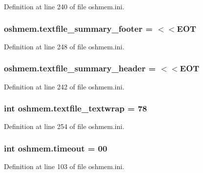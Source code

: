 Definition at line 240 of file oshmem.\-ini.

\hypertarget{namespaceoshmem_a8aad4aa9999524970a03dbaac95ee861}{
\subsubsection[{textfile\-\_\-summary\-\_\-footer}]{\setlength{\rightskip}{0pt plus 5cm}oshmem.\-textfile\-\_\-summary\-\_\-footer = $<$$<$E\-O\-T}}\label{namespaceoshmem_a8aad4aa9999524970a03dbaac95ee861}


Definition at line 248 of file oshmem.\-ini.

\hypertarget{namespaceoshmem_a145ad9a14eac762c5d8f46b444299ef9}{
\subsubsection[{textfile\-\_\-summary\-\_\-header}]{\setlength{\rightskip}{0pt plus 5cm}oshmem.\-textfile\-\_\-summary\-\_\-header = $<$$<$E\-O\-T}}\label{namespaceoshmem_a145ad9a14eac762c5d8f46b444299ef9}


Definition at line 242 of file oshmem.\-ini.

\hypertarget{namespaceoshmem_ab50c730a64d291ffba94c5a3258e7e2d}{
\subsubsection[{textfile\-\_\-textwrap}]{\setlength{\rightskip}{0pt plus 5cm}int oshmem.\-textfile\-\_\-textwrap = 78}}\label{namespaceoshmem_ab50c730a64d291ffba94c5a3258e7e2d}


Definition at line 254 of file oshmem.\-ini.

\hypertarget{namespaceoshmem_ae7496075a50f44287b21e26d8862972b}{
\subsubsection[{timeout}]{\setlength{\rightskip}{0pt plus 5cm}int oshmem.\-timeout = 00}}\label{namespaceoshmem_ae7496075a50f44287b21e26d8862972b}


Definition at line 103 of file oshmem.\-ini.

